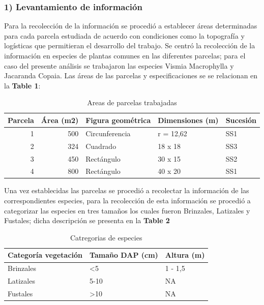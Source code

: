 \documentclass[letterpaper,9pt,twocolumn,twoside,]{pinp}
\begin{document}
\hypertarget{levantamiento-de-informaciuxf3n}{%
\subsubsection{1) Levantamiento de
información}\label{levantamiento-de-informaciuxf3n}}

Para la recolección de la información se procedió a establecer áreas
determinadas para cada parcela estudiada de acuerdo con condiciones como
la topografía y logísticas que permitieran el desarrollo del trabajo. Se
centró la recolección de la información en especies de plantas comunes
en las diferentes parcelas; para el caso del presente análisis se
trabajaron las especies Vismia Macrophylla y Jacaranda Copaia. Las áreas
de las parcelas y especificaciones se se relacionan en la \textbf{Table
1}:

\begin{table}

\caption{\label{tab:unnamed-chunk-1}Areas de parcelas trabajadas}
\centering
\begin{tabular}[t]{r|r|l|l|l}
\hline
Parcela & Área (m2) & Figura geométrica & Dimensiones (m) & Sucesión\\
\hline
1 & 500 & Circunferencia & r = 12,62 & SS1\\
\hline
2 & 324 & Cuadrado & 18 x 18 & SS3\\
\hline
3 & 450 & Rectángulo & 30 x 15 & SS2\\
\hline
4 & 800 & Rectángulo & 40 x 20 & SS1\\
\hline
\end{tabular}
\end{table}

Una vez establecidas las parcelas se procedió a recolectar la
información de las correspondientes especies, para la recolección de
esta información se procedió a categorizar las especies en tres tamaños
los cuales fueron Brinzales, Latizales y Fustales; dicha descripción se
presenta en la \textbf{Table 2}

\begin{table}

\caption{\label{tab:unnamed-chunk-2}Catregorias de especies}
\centering
\begin{tabular}[t]{l|l|l}
\hline
Categoría vegetación & Tamaño DAP (cm) & Altura (m)\\
\hline
Brinzales & <5 & 1 - 1,5\\
\hline
Latizales & 5-10 & NA\\
\hline
Fustales & >10 & NA\\
\hline
\end{tabular}
\end{table}
\end{document}
